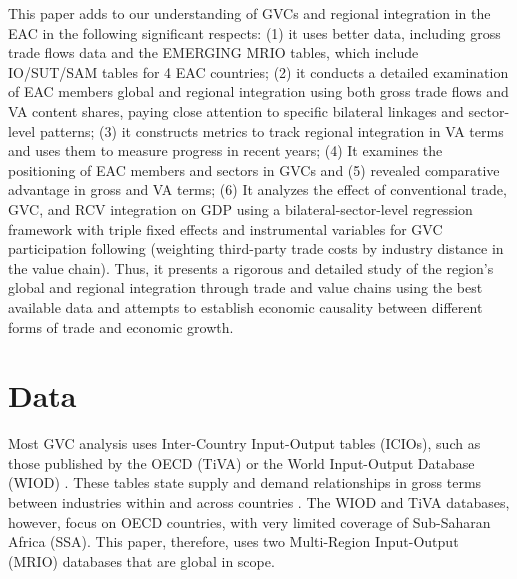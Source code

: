 \documentclass[a4paper]{article}
\begin{document}
This paper adds to our understanding of GVCs and regional integration in the EAC in the following significant respects: (1) it uses better data, including gross trade flows data and the EMERGING MRIO tables, which include IO/SUT/SAM tables for 4 EAC countries; (2) it conducts a detailed examination of EAC members global and regional integration using both gross trade flows and VA content shares, paying close attention to specific bilateral linkages and sector-level patterns; (3) it constructs metrics to track regional integration in VA terms and uses them to measure progress in recent years; (4) It examines the positioning of EAC members and sectors in GVCs and (5) revealed comparative advantage in gross and VA terms; (6) It analyzes the effect of conventional trade, GVC, and RCV integration on GDP using a bilateral-sector-level regression framework with triple fixed effects and instrumental variables for GVC participation following \citet{Kummritz20161} (weighting third-party trade costs by industry distance in the value chain). Thus, it presents a rigorous and detailed study of the region's global and regional integration through trade and value chains using the best available data and attempts to establish economic causality between different forms of trade and economic growth. 


\section{Data}

Most GVC analysis uses Inter-Country Input-Output tables (ICIOs), such as those published by the OECD (TiVA) or the World Input-Output Database (WIOD)  \citep{timmer2012world}. These tables state supply and demand relationships in gross terms between industries within and across countries \citep{Kummritz2014}. The WIOD and TiVA databases, however, focus on OECD countries, with very limited coverage of Sub-Saharan Africa (SSA). This paper, therefore, uses two Multi-Region Input-Output (MRIO) databases that are global in scope. \newline 
 
\end{document}
